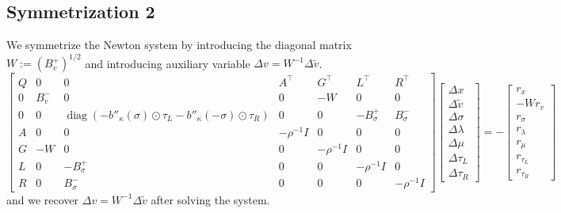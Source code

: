 \documentclass[11pt]{article}
\theoremstyle{plain}
\theoremstyle{definition}
\theoremstyle{remark}
\newcommand{\diag}{\operatorname{diag}}
\begin{document}
\subsection{Symmetrization 2}
We symmetrize the Newton system by introducing the diagonal matrix $W := (B_v^+)^{1/2}$
and introducing auxiliary variable $\Delta v = W^{-1}\Delta \tilde{v}$.
\begin{equation}
\begin{bmatrix}
    Q & 0 & 0 & A^\top & G^\top & L^\top & R^\top \\
    0 & B_v^- & 0 & 0 & -W & 0 & 0 \\
    0 & 0 & \diag{(-b''_\kappa(\sigma) \odot \tau_L - b''_\kappa(-\sigma) \odot \tau_R)} & 0 & 0 & -B_\sigma^+ & B_\sigma^- \\
    A & 0 & 0 & -\rho^{-1} I & 0 & 0 & 0 \\
    G & -W & 0 & 0 & -\rho^{-1} I & 0 & 0 \\
    L & 0 & -B_\sigma^+ & 0 & 0 & -\rho^{-1} I & 0 \\
    R & 0 & B_\sigma^- & 0 & 0 & 0 & -\rho^{-1} I
\end{bmatrix}
\begin{bmatrix}
    \Delta x \\ \Delta \tilde{v} \\ \Delta \sigma \\ \Delta \lambda \\ \Delta \mu \\ \Delta \tau_L \\ \Delta \tau_R
\end{bmatrix}
=
-\begin{bmatrix}
    r_x \\ -Wr_v \\ r_\sigma \\ r_\lambda \\ r_\mu \\ r_{\tau_L} \\ r_{\tau_R}
\end{bmatrix}
\end{equation}
and we recover $\Delta v = W^{-1}\Delta \tilde{v}$ after solving the system.
\end{document}
